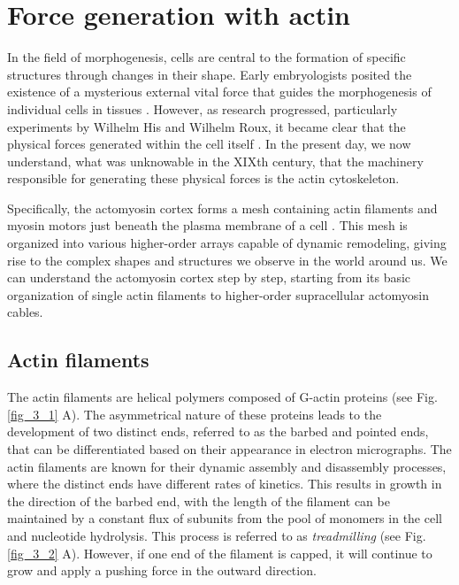 \hypertarget{force-generation-with-actin}{%
	\section{Force generation with
		actin}\label{force-generation-with-actin}}

In the field of morphogenesis, cells are central to the formation of specific structures through changes in their shape. Early embryologists posited the existence of a mysterious external vital force that guides the morphogenesis of individual cells in tissues \cite{thompson1979}. However, as research progressed, particularly experiments by Wilhelm His and Wilhelm Roux, it became clear that the physical forces generated within the cell itself \cite{clarke2021}. In the present day, we now understand, what was unknowable in the XIXth century, that the machinery responsible for generating these physical forces is the actin cytoskeleton.

Specifically, the actomyosin cortex forms a mesh containing actin filaments and myosin motors just beneath the plasma membrane of a cell \cite{alberts2015}. This mesh is organized into various higher-order arrays capable of dynamic remodeling, giving rise to the complex shapes and structures we observe in the world around us. We can understand the actomyosin cortex step by step, starting from its basic organization of single actin filaments to higher-order supracellular actomyosin cables.

\hypertarget{actin-filaments}{%
	\subsection{Actin filaments}\label{actin-filaments}}

The actin filaments are helical polymers composed of G-actin proteins (see Fig. \ref{fig_3_1} A).
The asymmetrical nature of these proteins leads to the development of two distinct ends, referred to as the barbed and pointed ends, that can be differentiated based on their appearance in electron micrographs. The actin filaments are known for their dynamic assembly and disassembly processes, where the distinct ends have different rates of kinetics. This results in growth in the direction of the barbed end, with the length of the filament can be maintained by a constant flux of subunits from the pool of monomers in the cell and nucleotide hydrolysis. This process is referred to as \textit{treadmilling} (see Fig. \ref{fig_3_2} A). However, if one end of the filament is capped, it will continue to grow and apply a pushing force in the outward direction.

